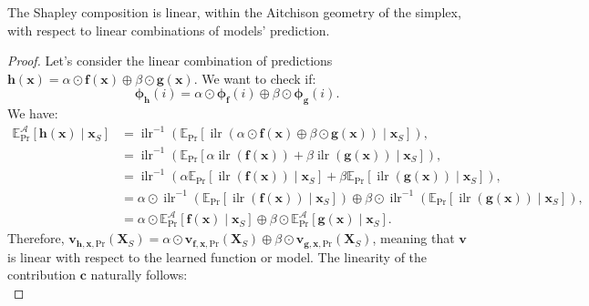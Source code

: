 \documentclass{article}
\theoremstyle{plain}
\theoremstyle{definition}
\theoremstyle{remark}
\DeclareMathOperator{\ilr}{ilr}
\begin{document}
The Shapley composition is linear, within the Aitchison geometry of the simplex, with respect to linear combinations of models' prediction.
\begin{proof}
  Let's consider the linear combination of predictions $\bm{h}(\bm{x}) = \alpha \odot \bm{f}(\bm{x}) \oplus \beta \odot \bm{g}(\bm{x})$. We want to check if:
  \begin{equation}
    \label{eq:linearsimplex}
    \bm{\phi}_{\bm{h}}(i) = \alpha \odot \bm{\phi}_{\bm{f}}(i) \oplus \beta\odot \bm{\phi}_{\bm{g}}(i).
  \end{equation}
  We have:
  \begin{equation}
    \begin{aligned}
      \mathbb{E}^{\mathcal{A}}_{\text{Pr}}[\bm{h}(\bm{x})\mid \bm{x}_S] &= \ilr^{-1} \left( \mathbb{E}_{\text{Pr}} [\ilr \left(  \alpha \odot \bm{f}(\bm{x}) \oplus \beta \odot \bm{g}(\bm{x}) \right) \mid \bm{x}_S] \right),\\
                                                                        &= \ilr^{-1} \left( \mathbb{E}_{\text{Pr}} [\alpha \ilr \left( \bm{f}(\bm{x})\right) + \beta \ilr \left( \bm{g}(\bm{x}) \right) \mid \bm{x}_S] \right),\\
                                                                        &= \ilr^{-1} \left( \alpha \mathbb{E}_{\text{Pr}} [ \ilr \left( \bm{f}(\bm{x})\right) \mid \bm{x}_S] + \beta \mathbb{E}_{\text{Pr}} [ \ilr \left( \bm{g}(\bm{x}) \right) \mid \bm{x}_S] \right),\\
                                                                        &= \alpha \odot \ilr^{-1} \left( \mathbb{E}_{\text{Pr}} [ \ilr \left( \bm{f}(\bm{x})\right) \mid \bm{x}_S] \right) \oplus \beta \odot \ilr^{-1} \left( \mathbb{E}_{\text{Pr}} [ \ilr \left( \bm{g}(\bm{x}) \right) \mid \bm{x}_S] \right),\\
                                                                        &= \alpha \odot \mathbb{E}^{\mathcal{A}}_{\text{Pr}}[\bm{f}(\bm{x})\mid \bm{x}_S] \oplus \beta \odot \mathbb{E}^{\mathcal{A}}_{\text{Pr}}[\bm{g}(\bm{x})\mid \bm{x}_S].
    \end{aligned}
  \end{equation}
  Therefore, $\bm{v}_{\bm{h},\bm{x},\text{Pr}}(\bm{X}_S) = \alpha \odot \bm{v}_{\bm{f},\bm{x},\text{Pr}}(\bm{X}_S) \oplus \beta \odot \bm{v}_{\bm{g},\bm{x},\text{Pr}}(\bm{X}_S)$, meaning that $\bm{v}$ is linear with respect to the learned function or model. The linearity of the contribution $\bm{c}$ naturally follows:
  \begin{equation}

\end{equation}
\end{proof}
\end{document}
